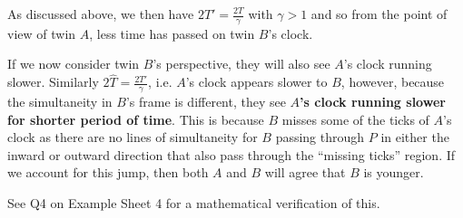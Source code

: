 \documentclass[../main.tex]{subfiles}
\begin{document}
\begin{example}
\begin{center}
  \end{center}
  As discussed above, we then have $2T' = \frac{2T}{\gamma}$ with $\gamma > 1$ and so from the point of view of twin $A$, less time has passed on twin $B$'s clock.

  If we now consider twin $B$'s perspective, they will also see $A$'s clock running slower.
  Similarly $2\hat{T} = \frac{2T'}{\gamma}$, i.e. $A$'s clock appears slower to $B$, however, because the simultaneity in $B$'s frame is different, they see \textbf{$A$'s clock running slower for shorter period of time}.
  This is because $B$ misses some of the ticks of $A$'s clock as there are no lines of simultaneity for $B$ passing through $P$ in either the inward or outward direction that also pass through the ``missing ticks'' region.
  If we account for this jump, then both $A$ and $B$ will agree that $B$ is younger.
\end{example}
\begin{remark}
  See Q4 on Example Sheet 4 for a mathematical verification of this.
\end{remark}
\end{document}
